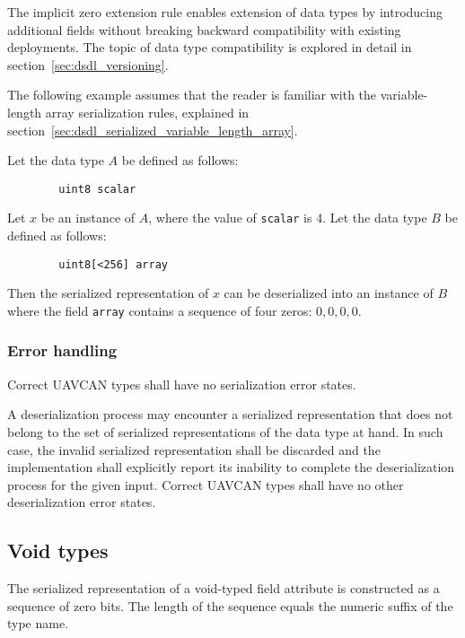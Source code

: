 \begin{remark}
    The implicit zero extension rule enables extension of data types by introducing additional fields
    without breaking backward compatibility with existing deployments.
    The topic of data type compatibility is explored in detail in section~\ref{sec:dsdl_versioning}.

    The following example assumes that the reader is familiar with the variable-length array serialization rules,
    explained in section~\ref{sec:dsdl_serialized_variable_length_array}.

    Let the data type $A$ be defined as follows:

    \begin{verbatim}
        uint8 scalar
    \end{verbatim}

    Let $x$ be an instance of $A$, where the value of \verb|scalar| is 4.
    Let the data type $B$ be defined as follows:

    \begin{verbatim}
        uint8[<256] array
    \end{verbatim}

    Then the serialized representation of $x$ can be deserialized into an instance of $B$ where the field
    \verb|array| contains a sequence of four zeros: $0, 0, 0, 0$.
\end{remark}

\subsubsection{Error handling}

Correct UAVCAN types shall have no serialization error states.

A deserialization process may encounter a serialized representation that does not belong to the
set of serialized representations of the data type at hand.
In such case, the invalid serialized representation shall be discarded and the implementation
shall explicitly report its inability to complete the deserialization process for the given input.
Correct UAVCAN types shall have no other deserialization error states.

\subsection{Void types}\label{sec:dsdl_serialized_void}

The serialized representation of a void-typed field attribute is constructed as a sequence of zero bits.
The length of the sequence equals the numeric suffix of the type name.

